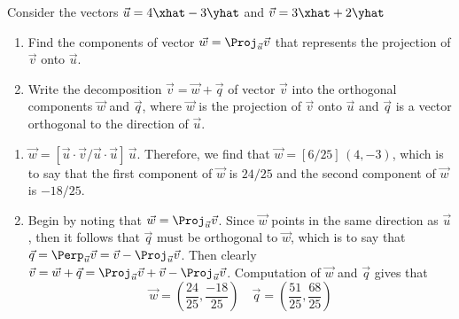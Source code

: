 \begin{exercises}
\begin{problist}
        \prob[\openstax]	Consider the vectors $\vec{u} = 4\xhat - 3\yhat$ and $\vec{v} = 3\xhat +
        2\yhat$
			\begin{enumerate}
				\item	Find the components of vector $\vec{w} = \Proj_{\vec{u}}\vec{v}$
					that represents the projection of $\vec{v}$ onto $\vec{u}$.
				\item	Write the decomposition $\vec{v} = \vec{w} + \vec{q}$ of vector
					$\vec{v}$ into the orthogonal components $\vec{w}$ and
					$\vec{q}$, where $\vec{w}$ is the projection of $\vec{v}$ onto
					$\vec{u}$ and $\vec{q}$ is a vector orthogonal to the direction
					of $\vec{u}$.
			\end{enumerate}
            \begin{solution}
                \begin{enumerate}
                    \item   $\vec{w} = [\vec{u} \cdot \vec{v} / \vec{u} \cdot \vec{u}] \, \vec{u}$.
                        Therefore, we find that $\vec{w} = [6/25] \, (4,-3)$, which is to say that the
                        first component of $\vec{w}$ is $24/25$ and the second component of $\vec{w}$ is
                        $-18/25$.
                    \item   Begin by noting that $\vec{w} = \Proj_{\vec{u}}\vec{v}$. Since $\vec{w}$
                        points in the same direction as $\vec{u}$, then it follows that $\vec{q}$ must
                        be orthogonal to $\vec{w}$, which is to say that $\vec{q} = \Perp_{\vec{u}}
                        \vec{v} = \vec{v} - \Proj_{\vec{u}} \vec{v}$. Then clearly $\vec{v} = \vec{w} +
                        \vec{q} = \Proj_{\vec{u}}\vec{v} + \vec{v} - \Proj_{\vec{u}}\vec{v}$.
                        Computation of $\vec{w}$ and $\vec{q}$ gives that
                        \[
                            \vec{w} = \left( \frac{24}{25}, \frac{-18}{25} \right) \quad \vec{q} =
                            \left( \frac{51}{25}, \frac{68}{25} \right)  
                        \]
                \end{enumerate}
            \end{solution}


\end{problist}
\end{exercises}
